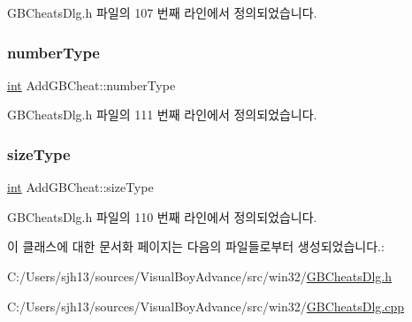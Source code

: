 G\+B\+Cheats\+Dlg.\+h 파일의 107 번째 라인에서 정의되었습니다.

\mbox{\label{class_add_g_b_cheat_ab49fa34156026418e26edf606aa82b1a}} 
\subsubsection{\texorpdfstring{number\+Type}{numberType}}
{\footnotesize\ttfamily \mbox{\hyperlink{_util_8cpp_a0ef32aa8672df19503a49fab2d0c8071}{int}} Add\+G\+B\+Cheat\+::number\+Type}



G\+B\+Cheats\+Dlg.\+h 파일의 111 번째 라인에서 정의되었습니다.

\mbox{\label{class_add_g_b_cheat_ae0603ce2570d5b09a64f4bd6c2107962}} 
\subsubsection{\texorpdfstring{size\+Type}{sizeType}}
{\footnotesize\ttfamily \mbox{\hyperlink{_util_8cpp_a0ef32aa8672df19503a49fab2d0c8071}{int}} Add\+G\+B\+Cheat\+::size\+Type}



G\+B\+Cheats\+Dlg.\+h 파일의 110 번째 라인에서 정의되었습니다.



이 클래스에 대한 문서화 페이지는 다음의 파일들로부터 생성되었습니다.\+:\begin{DoxyCompactItemize}
\item 
C\+:/\+Users/sjh13/sources/\+Visual\+Boy\+Advance/src/win32/\mbox{\hyperlink{_g_b_cheats_dlg_8h}{G\+B\+Cheats\+Dlg.\+h}}\item 
C\+:/\+Users/sjh13/sources/\+Visual\+Boy\+Advance/src/win32/\mbox{\hyperlink{_g_b_cheats_dlg_8cpp}{G\+B\+Cheats\+Dlg.\+cpp}}\end{DoxyCompactItemize}
